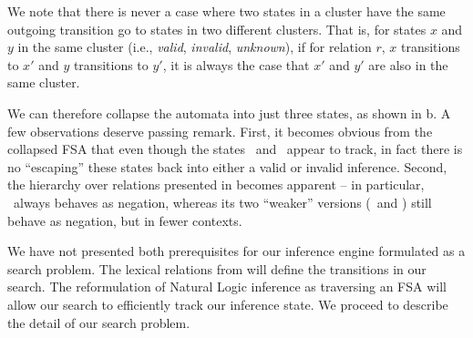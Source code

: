 We note that there is never a case where two states in a cluster have
  the same outgoing transition go to states in two different clusters.
That is, for states $x$ and $y$ in the same cluster
  (i.e., \textit{valid}, \textit{invalid}, \textit{unknown}),
  if for relation
  $r$, $x$ transitions to $x'$ and $y$ transitions to $y'$, it is always
  the case that $x'$ and $y'$ are also in the same cluster.

We can therefore collapse the automata into just three states, as shown
  in b.
A few observations deserve passing remark.
First, it becomes obvious from the collapsed FSA that even though the
  states \reverse\ and \cover\ appear to track, in fact there is no
  ``escaping'' these states back into either a valid or invalid
  inference.
Second, the hierarchy over relations presented in
   becomes apparent -- in particular,
  \negate\ always behaves as negation, whereas its two ``weaker''
  versions (\alternate\ and \cover) still behave as negation, but in
  fewer contexts.

We have not presented both prerequisites for our inference engine
  formulated as a search problem.
The lexical relations from  will define the transitions
  in our search.
The reformulation of Natural Logic inference as traversing an FSA will
  allow our search to efficiently track our inference state.
We proceed to describe the detail of our search problem.
